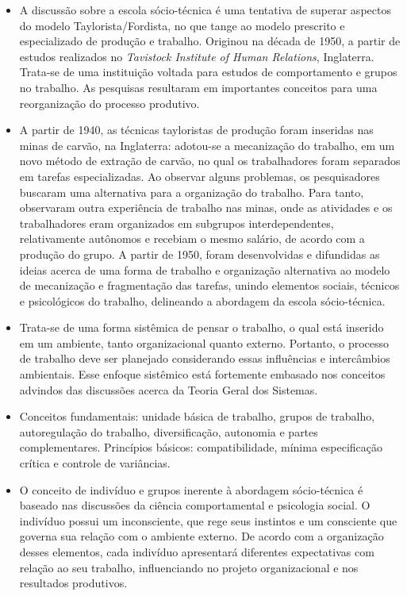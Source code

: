\documentclass{article}
\begin{document}
\begin{itemize}
    \item A discussão sobre a escola sócio-técnica é uma tentativa de superar aspectos do modelo Taylorista/Fordista, no que tange ao modelo prescrito e especializado de produção e trabalho. Originou na década de 1950, a partir de estudos realizados no \emph{Tavistock Institute of Human Relations}, Inglaterra. Trata-se de uma instituição voltada para estudos de comportamento e grupos no trabalho. As pesquisas resultaram em importantes conceitos para uma reorganização do processo produtivo. 
    \item A partir de 1940, as técnicas tayloristas de produção foram inseridas nas minas de carvão, na Inglaterra: adotou-se a mecanização do trabalho, em um novo método de extração de carvão, no qual os trabalhadores foram separados em tarefas especializadas. Ao observar alguns problemas, os pesquisadores buscaram uma alternativa para a organização do trabalho. Para tanto, observaram outra experiência de trabalho nas minas, onde as atividades e os trabalhadores eram organizados em subgrupos interdependentes, relativamente autônomos e recebiam o mesmo salário, de acordo com a produção do grupo. A partir de 1950, foram desenvolvidas e difundidas as ideias acerca de uma forma de trabalho e organização alternativa ao modelo de mecanização e fragmentação das tarefas, unindo elementos sociais, técnicos e psicológicos do trabalho, delineando a abordagem da escola sócio-técnica.
    \item Trata-se de uma forma sistêmica de pensar o trabalho, o qual está inserido em um ambiente, tanto organizacional quanto externo. Portanto, o processo de trabalho deve ser planejado considerando essas influências e intercâmbios ambientais. Esse enfoque sistêmico está fortemente embasado nos conceitos advindos das discussões acerca da Teoria Geral dos Sistemas.
    \item Conceitos fundamentais: unidade básica de trabalho, grupos de trabalho, autoregulação do trabalho, diversificação, autonomia e partes complementares. Princípios básicos: compatibilidade, mínima especificação crítica e controle de variâncias.
    \item O conceito de indivíduo e grupos inerente à abordagem sócio-técnica é baseado nas discussões da ciência comportamental e psicologia social. O indivíduo possui um inconsciente, que rege seus instintos e um consciente que governa sua relação com o ambiente externo. De acordo com a organização desses elementos, cada indivíduo apresentará diferentes expectativas com relação ao seu trabalho, influenciando no projeto organizacional e nos resultados produtivos.

\end{itemize}
\end{document}
